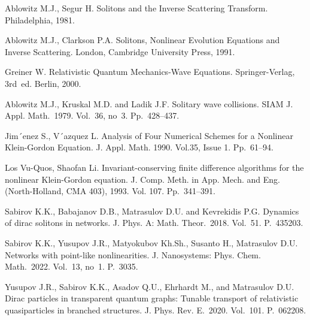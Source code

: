 \documentclass[12pt]{llncs}
\begin{document}
\begin{thebibliography}{9} %

 Ablowitz M.J., Segur H. Solitons and the Inverse Scattering Transform. Philadelphia, 1981.

 Ablowitz M.J., Clarkson P.A. Solitons, Nonlinear Evolution Equations and Inverse Scattering. London, Cambridge University Press, 1991.

 Greiner W. Relativistic Quantum Mechanics-Wave Equations. Springer-Verlag, 3rd~ed. Berlin, 2000.

 Ablowitz M.J., Kruskal M.D. and Ladik J.F. Solitary wave collisions. SIAM J. Appl. Math.~1979. Vol.~36, no~3. Pp.~428--437.

 Jim´enez S., V´azquez L. Analysis of Four Numerical Schemes for a Nonlinear Klein-Gordon Equation. J. Appl. Math. 1990. Vol.35, Issue 1. Pp.~61--94.

 Los Vu-Quos, Shaofan Li. Invariant-conserving finite difference algorithms for the nonlinear Klein-Gordon equation. J. Comp. Meth. in App. Mech. and Eng. (North-Holland, CMA 403), 1993. Vol. 107. Pp.~341--391.

 Sabirov K.K., Babajanov D.B., Matrasulov D.U. and Kevrekidis P.G. Dynamics of dirac solitons in networks. J. Phys. A: Math. Theor.~2018. Vol.~51. P.~435203.

 Sabirov K.K., Yusupov J.R., Matyokubov Kh.Sh., Susanto H., Matrasulov D.U. Networks with point-like nonlinearities. J. Nanosystems: Phys. Chem. Math.~2022. Vol.~13, no~1. P.~3035.

 Yusupov J.R., Sabirov K.K., Asadov Q.U., Ehrhardt M., and Matrasulov D.U. Dirac particles in transparent quantum graphs: Tunable transport of relativistic quasiparticles in branched structures. J. Phys. Rev. E.~2020. Vol.~101. P.~062208.      
\end{thebibliography}

\end{document}
